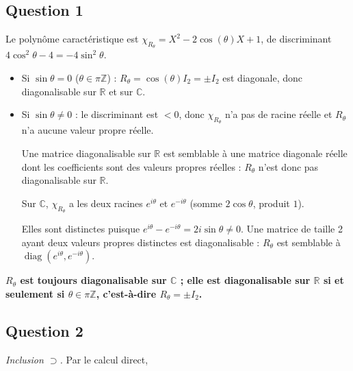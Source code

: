 \documentclass[11pt,a4paper]{article}
\newcommand{\equationajustee}[1]{%
  \sbox{\boiteequation}{$\displaystyle #1$}%
  \ifdim\wd\boiteequation>\linewidth
    \[\resizebox{\linewidth}{!}{\usebox{\boiteequation}}\]%
  \else
    \[#1\]%
  \fi}
\begin{document}
\hypertarget{question-1}{%
\subsection{Question 1}\label{question-1}}

Le polynôme caractéristique est \(\chi_{R_\theta}=X^2-2\cos(\theta)X+1\), de discriminant \(4\cos^2\theta-4=-4\sin^2\theta\).

\begin{itemize}
\item
  Si \(\sin\theta=0\) (\(\theta\in\pi\mathbb{Z}\)) : \(R_\theta=\cos(\theta)I_2=\pm I_2\) est diagonale, donc diagonalisable sur \(\mathbb{R}\) et sur \(\mathbb{C}\).
\item
  Si \(\sin\theta\neq0\) : le discriminant est \(<0\), donc \(\chi_{R_\theta}\) n'a pas de racine réelle et \(R_\theta\) n'a aucune valeur propre réelle.

  Une matrice diagonalisable sur \(\mathbb{R}\) est semblable à une matrice diagonale réelle dont les coefficients sont des valeurs propres réelles : \(R_\theta\) n'est donc pas diagonalisable sur \(\mathbb{R}\).

  Sur \(\mathbb{C}\), \(\chi_{R_\theta}\) a les deux racines \(e^{i\theta}\) et \(e^{-i\theta}\) (somme \(2\cos\theta\), produit \(1\)).

  Elles sont distinctes puisque \(e^{i\theta}-e^{-i\theta}=2i\sin\theta\neq0\). Une matrice de taille 2 ayant deux valeurs propres distinctes est diagonalisable : \(R_\theta\) est semblable à \(\operatorname{diag}(e^{i\theta},e^{-i\theta})\).
\end{itemize}

\textbf{\(R_\theta\) est toujours diagonalisable sur \(\mathbb{C}\) ; elle est diagonalisable sur \(\mathbb{R}\) si et seulement si \(\theta\in\pi\mathbb{Z}\), c'est-à-dire \(R_\theta=\pm I_2\).}

\hypertarget{question-2}{%
\subsection{Question 2}\label{question-2}}

\emph{Inclusion \(\supset\).} Par le calcul direct,

\equationajustee{R_\theta^\top R_\theta=\begin{pmatrix}\cos^2\theta+\sin^2\theta&0\\0&\sin^2\theta+\cos^2\theta\end{pmatrix}=I_2,}
\end{document}
